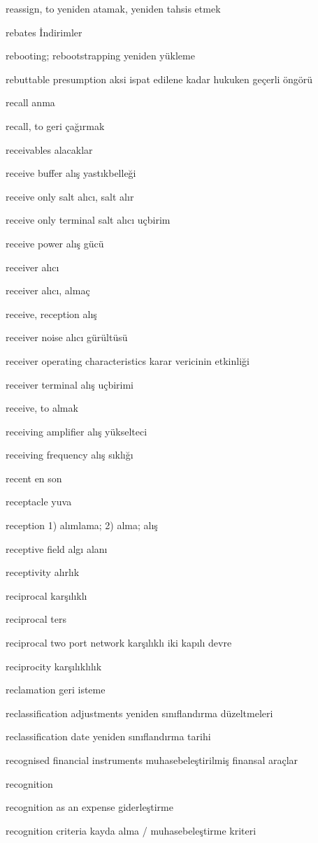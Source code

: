 \documentclass[12pt,fleqn]{article}\usepackage{../../common}
\begin{document}
reassign, to yeniden atamak, yeniden tahsis etmek

rebates İndirimler

rebooting; rebootstrapping yeniden yükleme

rebuttable presumption aksi ispat edilene kadar hukuken geçerli öngörü

recall anma

recall, to geri çağırmak

receivables alacaklar

receive buffer alış yastıkbelleği

receive only salt alıcı, salt alır

receive only terminal salt alıcı uçbirim

receive power alış gücü

receiver alıcı

receiver alıcı, almaç

receive, reception alış

receiver noise alıcı gürültüsü

receiver operating characteristics karar vericinin etkinliği

receiver terminal alış uçbirimi

receive, to almak

receiving amplifier alış yükselteci

receiving frequency alış sıklığı

recent en son

receptacle yuva

reception 1) alımlama; 2) alma; alış

receptive field algı alanı

receptivity alırlık

reciprocal karşılıklı

reciprocal ters

reciprocal two port network karşılıklı iki kapılı devre

reciprocity karşılıklılık

reclamation geri isteme

reclassification adjustments yeniden sınıflandırma düzeltmeleri

reclassification date yeniden sınıflandırma tarihi

recognised financial instruments muhasebeleştirilmiş finansal araçlar

recognition

recognition as an expense giderleştirme

recognition criteria kayda alma / muhasebeleştirme kriteri
\end{document}
